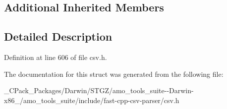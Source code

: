 \subsection*{Additional Inherited Members}


\subsection{Detailed Description}


Definition at line 606 of file csv.\+h.



The documentation for this struct was generated from the following file\+:\begin{DoxyCompactItemize}
\item 
\+\_\+\+C\+Pack\+\_\+\+Packages/\+Darwin/\+S\+T\+G\+Z/amo\+\_\+tools\+\_\+suite-\/-\/\+Darwin-\/x86\+\_/amo\+\_\+tools\+\_\+suite/include/fast-\/cpp-\/csv-\/parser/csv.\+h\end{DoxyCompactItemize}
